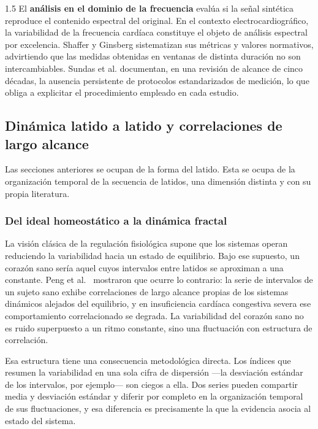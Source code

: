 \begin{spacing}{1.5}
El \textbf{análisis en el dominio de la frecuencia} evalúa si la señal sintética reproduce el contenido espectral del original. En el contexto electrocardiográfico, la variabilidad de la frecuencia cardíaca constituye el objeto de análisis espectral por excelencia. Shaffer y Ginsberg \cite{shaffer2017overview} sistematizan sus métricas y valores normativos, advirtiendo que las medidas obtenidas en ventanas de distinta duración no son intercambiables. Sundas et al. \cite{sundas2025hrv} documentan, en una revisión de alcance de cinco décadas, la ausencia persistente de protocolos estandarizados de medición, lo que obliga a explicitar el procedimiento empleado en cada estudio.

\subsection{Dinámica latido a latido y correlaciones de largo alcance}

Las secciones anteriores se ocupan de la forma del latido. Esta se ocupa de la
organización temporal de la secuencia de latidos, una dimensión distinta y con
su propia literatura.

\subsubsection{Del ideal homeostático a la dinámica fractal}

La visión clásica de la regulación fisiológica supone que los sistemas operan
reduciendo la variabilidad hacia un estado de equilibrio. Bajo ese supuesto, un
corazón sano sería aquel cuyos intervalos entre latidos se aproximan a una
constante. Peng et al.\ \cite{peng1995quantification} mostraron que ocurre lo
contrario: la serie de intervalos de un sujeto sano exhibe correlaciones de
largo alcance propias de los sistemas dinámicos alejados del equilibrio, y en
insuficiencia cardíaca congestiva severa ese comportamiento correlacionado se
degrada. La variabilidad del corazón sano no es ruido superpuesto a un ritmo
constante, sino una fluctuación con estructura de correlación.

Esa estructura tiene una consecuencia metodológica directa. Los índices que
resumen la variabilidad en una sola cifra de dispersión —la desviación estándar
de los intervalos, por ejemplo— son ciegos a ella. Dos series pueden compartir
media y desviación estándar y diferir por completo en la organización temporal
de sus fluctuaciones, y esa diferencia es precisamente la que la evidencia
asocia al estado del sistema.


\end{spacing}
